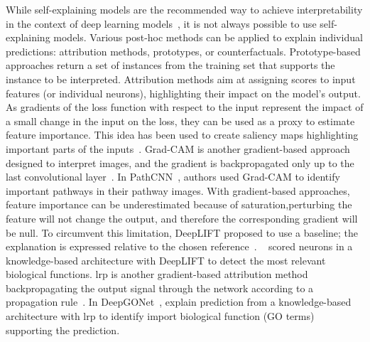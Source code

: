 \documentclass[../main.tex]{subfiles}
\begin{document}
	While self-explaining models are the recommended way to achieve interpretability in the context of deep learning models~\cite{Rudin2019}, it is not always possible to use self-explaining models.
	Various post-hoc methods can be applied to explain individual predictions: attribution methods, prototypes, or counterfactuals.
	Prototype-based approaches return a set of instances from the training set that supports the instance to be interpreted.
	Attribution methods aim at assigning scores to input features (or individual neurons), highlighting their impact on the model's output.
	As gradients of the loss function with respect to the input represent the impact of a small change in the input on the loss, they can be used as a proxy to estimate feature importance.
	This idea has been used to create saliency maps highlighting important parts of the inputs~\cite{intGrad}.
	Grad-CAM is another gradient-based approach designed to interpret images, and the gradient is backpropagated only up to the last convolutional layer~\cite{GradCAM}.
	In PathCNN~\cite{PathCNN}, authors used Grad-CAM to identify important pathways in their pathway images.
	With gradient-based approaches, feature importance can be underestimated because of saturation,\ie{}perturbing the feature will not change the output, and therefore the corresponding gradient will be null.
	To circumvent this limitation, DeepLIFT proposed to use a baseline; the explanation is expressed relative to the chosen reference~\cite{DeepLIFT}.
	\citeauthor{PNet}~\cite{PNet} scored neurons in a knowledge-based architecture with DeepLIFT to detect the most relevant biological functions.
	\Gls{lrp} is another gradient-based attribution method backpropagating the output signal through the network according to a propagation rule~\cite{LRP}.
	In DeepGONet~\cite{bourgeaisDeepGONetSelfexplainable2021}, \cite{bourgeaisDeepGONetSelfexplainable2021} explain prediction from a knowledge-based architecture with \gls{lrp} to identify import biological function (GO terms)
	supporting the prediction.
\end{document}
